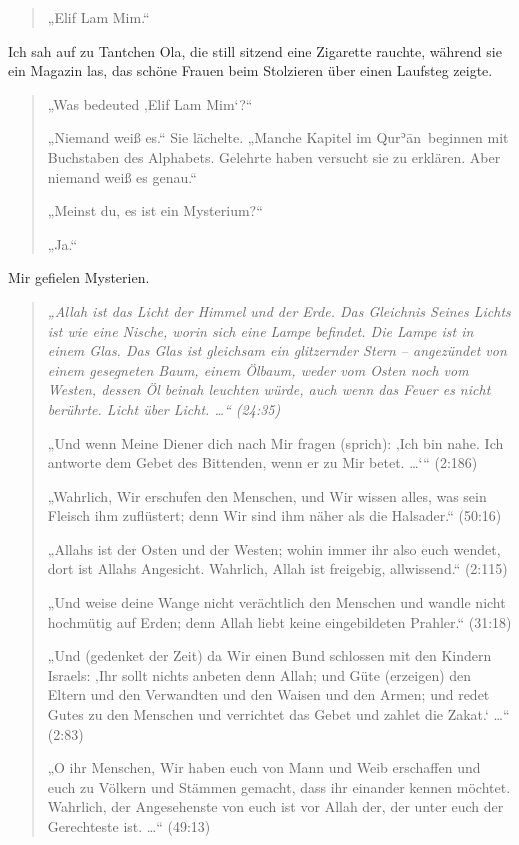 \documentclass[12pt]{memoir}
\def\´{ʾ} %
\def \Quran{Qur\-\´ān} %
\newcommand{\QRef}[1]{{\color{darkblue}#1}}
\begin{document}
\begin{quote}
„Elif Lam Mim.“
\end{quote}

Ich sah auf zu Tantchen Ola, die still sitzend eine Zigarette rauchte,
während sie ein Magazin las,
das schöne Frauen beim Stolzieren über einen Laufsteg zeigte.

\begin{quote}
„Was bedeuted ‚Elif Lam Mim‘?“

„Niemand weiß es.“ Sie lächelte.
„Manche Kapitel im \Quran\ beginnen mit Buchstaben des Alphabets.
Gelehrte haben versucht sie zu erklären.
Aber niemand weiß es genau.“

„Meinst du, es ist ein Mysterium?“

„Ja.“
\end{quote}

Mir gefielen Mysterien.

\begin{quote}
\itshape
„Allah ist das Licht der Himmel und der Erde.
Das Gleichnis Seines Lichts ist wie eine Nische,
worin sich eine Lampe befindet.
Die Lampe ist in einem Glas.
Das Glas ist gleichsam ein glitzernder Stern –
angezündet von einem gesegneten Baum, einem Ölbaum,
weder vom Osten noch vom Westen, dessen Öl beinah leuchten würde,
auch wenn das Feuer es nicht berührte.
Licht über Licht. …“
(\QRef{24:35})

„Und wenn Meine Diener dich nach Mir fragen (sprich):
‚Ich bin nahe. Ich antworte dem Gebet des Bittenden, wenn er zu Mir betet. …‘“
(\QRef{2:186})

„Wahrlich, Wir erschufen den Menschen, und Wir wissen alles,
was sein Fleisch ihm zuflüstert; denn Wir sind ihm näher als die Halsader.“
(\QRef{50:16})

„Allahs ist der Osten und der Westen; wohin immer ihr also euch wendet,
dort ist Allahs Angesicht. Wahrlich, Allah ist freigebig, allwissend.“
(\QRef{2:115})

„Und weise deine Wange nicht verächtlich den Menschen
und wandle nicht hochmütig auf Erden;
denn Allah liebt keine eingebildeten Prahler.“
(\QRef{31:18})

„Und (gedenket der Zeit) da Wir einen Bund schlossen mit den Kindern Israels:
‚Ihr sollt nichts anbeten denn Allah;
und Güte (erzeigen) den Eltern und den Verwandten und den Waisen und den Armen;
und redet Gutes zu den Menschen
und verrichtet das Gebet und zahlet die Zakat.‘ …“
(\QRef{2:83})

„O ihr Menschen, Wir haben euch von Mann und Weib erschaffen
und euch zu Völkern und Stämmen gemacht, dass ihr einander kennen möchtet.
Wahrlich, der Angesehenste von euch ist vor Allah der,
der unter euch der Gerechteste ist. …“
(\QRef{49:13})
\end{quote}
\end{document}
